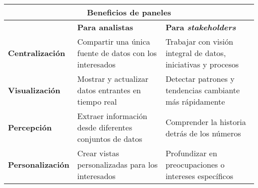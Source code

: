 \begin{table}
    \centering
    \begin{tabular}{|p{2.9cm}|p{5.4cm}|p{5.5cm}|}
        \hline
        \multicolumn{3}{|c|}{Beneficios de paneles} \\
        \hline
        & \textbf{Para analistas} & \textbf{Para \textit{stakeholders}} \\
        \hline
        \small{\textbf{Centralización}} & Compartir una única fuente de datos con los interesados & Trabajar con visión integral de datos, iniciativas y procesos \\
        \hline
        \small{\textbf{Visualización}} & Mostrar y actualizar datos \break entrantes en tiempo real & Detectar patrones y tendencias cambiante más rápidamente \\
        \hline
         \small{\textbf{Percepción}} & Extraer información desde \break diferentes conjuntos de datos & Comprender la historia detrás de los números \\
        \hline
        \small{\textbf{Personalización}} & Crear vistas personalizadas para los interesados & Profundizar en preocupaciones o intereses específicos \\
        \hline
    \end{tabular}
\end{table}

